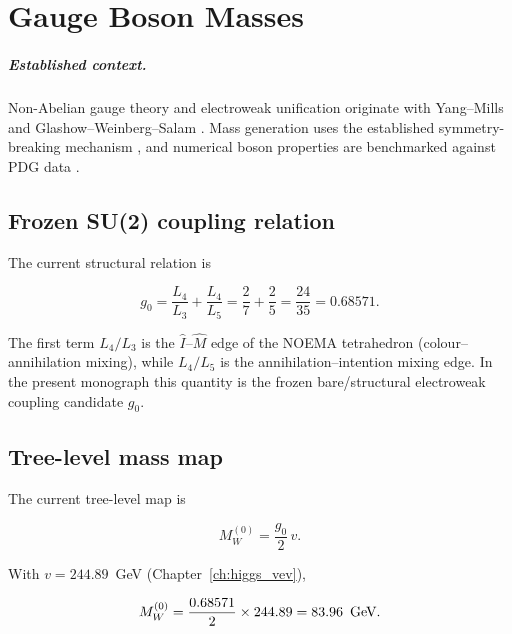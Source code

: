 \chapter{Gauge Boson Masses}
\label{ch:gauge_bosons}

\paragraph{Established context.}
Non-Abelian gauge theory and electroweak unification originate with Yang--Mills
and Glashow--Weinberg--Salam \cite{YangMills1954,Glashow1961,Weinberg1967,Salam1968}.
Mass generation uses the established symmetry-breaking mechanism
\cite{EnglertBrout1964,Higgs1964,GHK1964}, and numerical boson properties are
benchmarked against PDG data \cite{PDG2024}.


\section{Frozen SU(2) coupling relation}

The current structural relation is

\begin{equation}
g_0 = \frac{L_4}{L_3} + \frac{L_4}{L_5}
  = \frac{2}{7} + \frac{2}{5}
  = \frac{24}{35}
  = 0.68571.
\label{eq:g_coupling}
\end{equation}

The first term $L_4/L_3$ is the $\hat I$--$\hat M$ edge of the NOEMA
tetrahedron (colour--annihilation mixing), while $L_4/L_5$ is the
annihilation--intention mixing edge.  In the present monograph this quantity is
the frozen bare/structural electroweak coupling candidate $g_0$.

\section{Tree-level mass map}

The current tree-level map is

\[
M_W^{(0)} = \frac{g_0}{2}\,v.
\]

With $v = 244.89$~GeV (Chapter~\ref{ch:higgs_vev}),

\[
M_W^{(0)} = \frac{0.68571}{2}\times244.89
          = 83.96\ \,\text{GeV}.
\]

